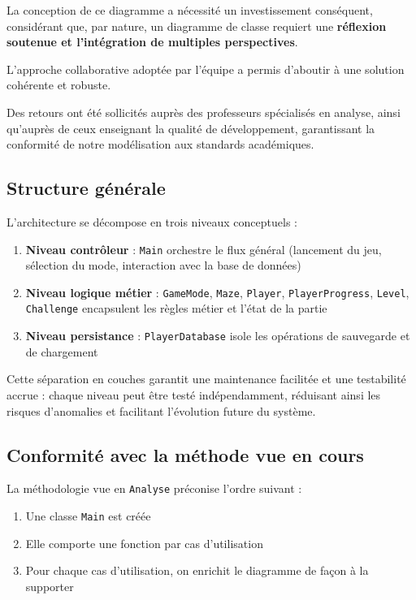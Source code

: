 \documentclass{butexFR}
\begin{document}
La conception de ce diagramme a nécessité un investissement conséquent, considérant que, par nature, un diagramme de classe requiert une \textbf{réflexion soutenue et l'intégration de multiples perspectives}.

L'approche collaborative adoptée par l'équipe a permis d'aboutir à une solution cohérente et robuste.

Des retours ont été sollicités auprès des professeurs spécialisés en analyse, ainsi qu'auprès de ceux enseignant la qualité de développement, garantissant la conformité de notre modélisation aux standards académiques.

\subsection{Structure générale}

L'architecture se décompose en trois niveaux conceptuels :

\begin{enumerate}

\item \textbf{Niveau contrôleur} : \texttt{Main} orchestre le flux général (lancement du jeu, sélection du mode, interaction avec la base de données)
\item \textbf{Niveau logique métier} : \texttt{GameMode}, \texttt{Maze}, \texttt{Player}, \texttt{PlayerProgress}, \texttt{Level}, \texttt{Challenge} encapsulent les règles métier et l'état de la partie
\item \textbf{Niveau persistance} : \texttt{PlayerDatabase} isole les opérations de sauvegarde et de chargement
\end{enumerate}

Cette séparation en couches garantit une maintenance facilitée et une testabilité accrue : chaque niveau peut être testé indépendamment, réduisant ainsi les risques d'anomalies et facilitant l'évolution future du système.

\subsection{Conformité avec la méthode vue en cours}

La méthodologie vue en \texttt{Analyse} préconise l'ordre suivant :

\begin{enumerate}
\item Une classe \texttt{Main} est créée
\item Elle comporte une fonction par cas d'utilisation
\item Pour chaque cas d'utilisation, on enrichit le diagramme de façon à la supporter
\end{enumerate}
\end{document}
